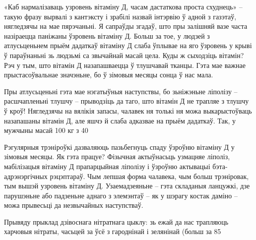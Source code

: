 «Каб нармалізаваць узровень вітаміну Д, часам дастаткова проста схуднець» – такую фразу вырвалі з кантэксту і зрабілі назвай інтэрвію ў адной з газэтаў, нягледзячы на мае пярэчаньні. Я сапраўды згадаў, што пры залішняй вазе часта назіраецца паніжаны ўзровень вітаміну Д. Больш за тое, у людзей з атлусьценьнем прыём дадаткаў вітаміну Д слаба ўплывае на яго ўзровень у крыві ў параўнаньні зь людзьмі са звычайнай масай цела. Куды ж сыходзіць вітамін? Рэч у тым, што вітамін Д назапашваецца ў тлушчавай тканцы. Гэта мае важнае прыстасоўвальнае значэньне, бо ў зімовыя месяцы сонца ў нас мала.

Пры атлусьценьні гэта мае нэгатыўныя наступствы, бо зьніжэньне ліполізу – расшчапленьні тлушчу – прыводзіць да таго, што вітамін Д не трапляе з тлушчу ў кроў! Нягледзячы на вялікія запасы, чалавек ня толькі ня можа выкарыстоўваць назапашаны вітамін Д, але яшчэ й слаба адказвае на прыём дадаткаў. Так, у мужчыны масай 100 кг з 40%

Рэгулярныя трэніроўкі дазваляюць пазьбегнуць спаду ўзроўню вітаміну Д у зімовыя месяцы. Як гэта працуе? Фізычная актыўнасьць узмацняе ліполіз, мабілізацыя вітаміну Д прапарцыйная ліполізу і ўзроўню актывацыі бэта-адрэнэргічных рэцэптараў. Чым лепшая форма чалавека, чым больш трэніровак, тым вышэй узровень вітаміну Д. Узаемадзеяньне – гэта складаныя ланцужкі, дзе парушэньне або падзеньне аднаго з элемэнтаў – як у шэрагу костак даміно – можа прывесьці да незвычайных наступстваў.

Прывяду прыклад дзівоснага нітратнага цыклу: зь ежай да нас трапляюць харчовыя нітраты, часьцей за ўсё з гароднінай і зелянінай (больш за 85%

